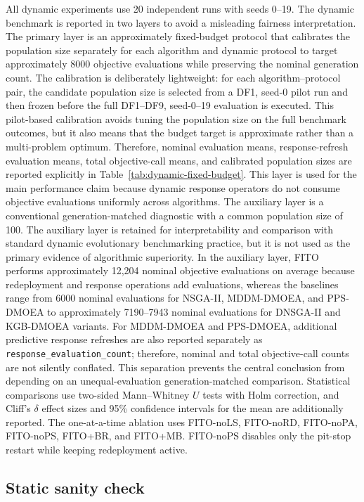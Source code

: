 \documentclass[preprint,12pt]{elsarticle}
\begin{document}
All dynamic experiments use 20 independent runs with seeds 0--19. The dynamic benchmark is reported in two layers to avoid a misleading fairness interpretation. The primary layer is an approximately fixed-budget protocol that calibrates the population size separately for each algorithm and dynamic protocol to target approximately 8000 objective evaluations while preserving the nominal generation count. The calibration is deliberately lightweight: for each algorithm--protocol pair, the candidate population size is selected from a DF1, seed-0 pilot run and then frozen before the full DF1--DF9, seed-0--19 evaluation is executed. This pilot-based calibration avoids tuning the population size on the full benchmark outcomes, but it also means that the budget target is approximate rather than a multi-problem optimum. Therefore, nominal evaluation means, response-refresh evaluation means, total objective-call means, and calibrated population sizes are reported explicitly in Table~\ref{tab:dynamic-fixed-budget}. This layer is used for the main performance claim because dynamic response operators do not consume objective evaluations uniformly across algorithms. The auxiliary layer is a conventional generation-matched diagnostic with a common population size of 100. The auxiliary layer is retained for interpretability and comparison with standard dynamic evolutionary benchmarking practice, but it is not used as the primary evidence of algorithmic superiority. In the auxiliary layer, FITO performs approximately 12,204 nominal objective evaluations on average because redeployment and response operations add evaluations, whereas the baselines range from 6000 nominal evaluations for NSGA-II, MDDM-DMOEA, and PPS-DMOEA to approximately 7190--7943 nominal evaluations for DNSGA-II and KGB-DMOEA variants. For MDDM-DMOEA and PPS-DMOEA, additional predictive response refreshes are also reported separately as \texttt{response\_evaluation\_count}; therefore, nominal and total objective-call counts are not silently conflated. This separation prevents the central conclusion from depending on an unequal-evaluation generation-matched comparison. Statistical comparisons use two-sided Mann--Whitney $U$ tests with Holm correction, and Cliff's $\delta$ effect sizes and 95\% confidence intervals for the mean are additionally reported. The one-at-a-time ablation uses FITO-noLS, FITO-noRD, FITO-noPA, FITO-noPS, FITO+BR, and FITO+MB. FITO-noPS disables only the pit-stop restart while keeping redeployment active.

\subsection{Static sanity check}
\end{document}
